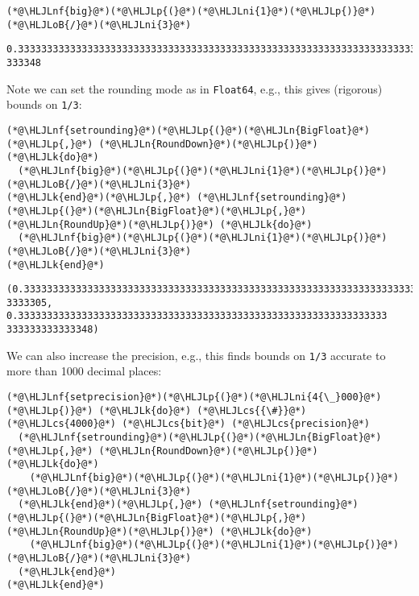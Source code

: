 \documentclass[12pt,a4paper]{article}
\newcommand{\HLJLk}[1]{\textcolor[RGB]{148,91,176}{\textbf{#1}}}
\newcommand{\HLJLn}[1]{#1}
\newcommand{\HLJLnf}[1]{\textcolor[RGB]{66,102,213}{#1}}
\newcommand{\HLJLni}[1]{\textcolor[RGB]{59,151,46}{#1}}
\newcommand{\HLJLoB}[1]{\textcolor[RGB]{102,102,102}{\textbf{#1}}}
\newcommand{\HLJLp}[1]{#1}
\newcommand{\HLJLcs}[1]{\textcolor[RGB]{153,153,119}{\textit{#1}}}
\begin{document}
\begin{lstlisting}
(*@\HLJLnf{big}@*)(*@\HLJLp{(}@*)(*@\HLJLni{1}@*)(*@\HLJLp{)}@*)(*@\HLJLoB{/}@*)(*@\HLJLni{3}@*)
\end{lstlisting}

\begin{lstlisting}
0.3333333333333333333333333333333333333333333333333333333333333333333333333
333348
\end{lstlisting}


Note we can set the rounding mode as in \texttt{Float64}, e.g., this gives (rigorous) bounds on \texttt{1/3}:


\begin{lstlisting}
(*@\HLJLnf{setrounding}@*)(*@\HLJLp{(}@*)(*@\HLJLn{BigFloat}@*)(*@\HLJLp{,}@*) (*@\HLJLn{RoundDown}@*)(*@\HLJLp{)}@*) (*@\HLJLk{do}@*)
  (*@\HLJLnf{big}@*)(*@\HLJLp{(}@*)(*@\HLJLni{1}@*)(*@\HLJLp{)}@*)(*@\HLJLoB{/}@*)(*@\HLJLni{3}@*)
(*@\HLJLk{end}@*)(*@\HLJLp{,}@*) (*@\HLJLnf{setrounding}@*)(*@\HLJLp{(}@*)(*@\HLJLn{BigFloat}@*)(*@\HLJLp{,}@*) (*@\HLJLn{RoundUp}@*)(*@\HLJLp{)}@*) (*@\HLJLk{do}@*)
  (*@\HLJLnf{big}@*)(*@\HLJLp{(}@*)(*@\HLJLni{1}@*)(*@\HLJLp{)}@*)(*@\HLJLoB{/}@*)(*@\HLJLni{3}@*)
(*@\HLJLk{end}@*)
\end{lstlisting}

\begin{lstlisting}
(0.333333333333333333333333333333333333333333333333333333333333333333333333
3333305, 0.3333333333333333333333333333333333333333333333333333333333333333
333333333333348)
\end{lstlisting}


We can also increase the precision, e.g., this finds bounds on \texttt{1/3} accurate to more than 1000 decimal places:


\begin{lstlisting}
(*@\HLJLnf{setprecision}@*)(*@\HLJLp{(}@*)(*@\HLJLni{4{\_}000}@*)(*@\HLJLp{)}@*) (*@\HLJLk{do}@*) (*@\HLJLcs{{\#}}@*) (*@\HLJLcs{4000}@*) (*@\HLJLcs{bit}@*) (*@\HLJLcs{precision}@*)
  (*@\HLJLnf{setrounding}@*)(*@\HLJLp{(}@*)(*@\HLJLn{BigFloat}@*)(*@\HLJLp{,}@*) (*@\HLJLn{RoundDown}@*)(*@\HLJLp{)}@*) (*@\HLJLk{do}@*)
    (*@\HLJLnf{big}@*)(*@\HLJLp{(}@*)(*@\HLJLni{1}@*)(*@\HLJLp{)}@*)(*@\HLJLoB{/}@*)(*@\HLJLni{3}@*)
  (*@\HLJLk{end}@*)(*@\HLJLp{,}@*) (*@\HLJLnf{setrounding}@*)(*@\HLJLp{(}@*)(*@\HLJLn{BigFloat}@*)(*@\HLJLp{,}@*) (*@\HLJLn{RoundUp}@*)(*@\HLJLp{)}@*) (*@\HLJLk{do}@*)
    (*@\HLJLnf{big}@*)(*@\HLJLp{(}@*)(*@\HLJLni{1}@*)(*@\HLJLp{)}@*)(*@\HLJLoB{/}@*)(*@\HLJLni{3}@*)
  (*@\HLJLk{end}@*)
(*@\HLJLk{end}@*)
\end{lstlisting}
\end{document}

